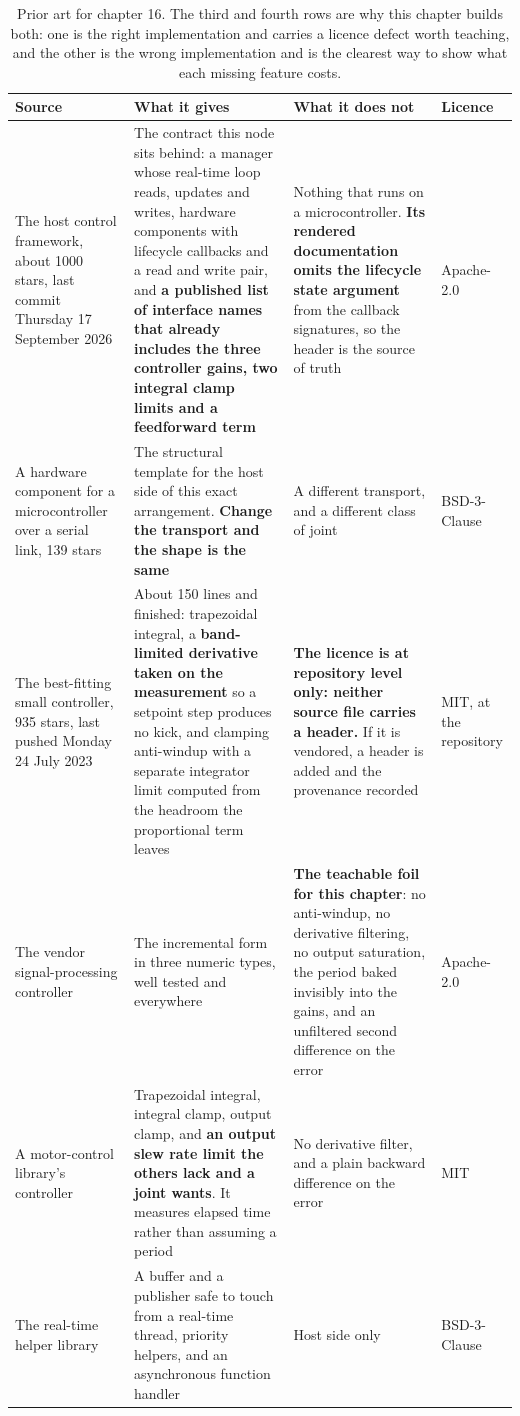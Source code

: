 \begin{table}[H]\centering\small
\begin{tabular}{p{34mm}p{46mm}p{38mm}p{20mm}}
\toprule
Source & What it gives & What it does not & Licence \\
\midrule
The host control framework, about 1000 stars, last commit Thursday 17 September
2026 & The contract this node sits behind: a manager whose real-time loop reads,
updates and writes, hardware components with lifecycle callbacks and a read and
write pair, and \textbf{a published list of interface names that already
includes the three controller gains, two integral clamp limits and a feedforward
term} & Nothing that runs on a microcontroller. \textbf{Its rendered
documentation omits the lifecycle state argument} from the callback signatures,
so the header is the source of truth & Apache-2.0 \\
A hardware component for a microcontroller over a serial link, 139 stars & The
structural template for the host side of this exact arrangement. \textbf{Change
the transport and the shape is the same} & A different transport, and a
different class of joint & BSD-3-Clause \\
The best-fitting small controller, 935 stars, last pushed Monday 24 July 2023 &
About 150 lines and finished: trapezoidal integral, a \textbf{band-limited
derivative taken on the measurement} so a setpoint step produces no kick, and
clamping anti-windup with a separate integrator limit computed from the headroom
the proportional term leaves & \textbf{The licence is at repository level only:
neither source file carries a header.} If it is vendored, a header is added and
the provenance recorded & MIT, at the repository \\
The vendor signal-processing controller & The incremental form in three numeric
types, well tested and everywhere & \textbf{The teachable foil for this
chapter}: no anti-windup, no derivative filtering, no output saturation, the
period baked invisibly into the gains, and an unfiltered second difference on
the error & Apache-2.0 \\
A motor-control library's controller & Trapezoidal integral, integral clamp,
output clamp, and \textbf{an output slew rate limit the others lack and a joint
wants}. It measures elapsed time rather than assuming a period & No derivative
filter, and a plain backward difference on the error & MIT \\
The real-time helper library & A buffer and a publisher safe to touch from a
real-time thread, priority helpers, and an asynchronous function handler & Host
side only & BSD-3-Clause \\
\bottomrule
\end{tabular}
\caption{Prior art for chapter 16. The third and fourth rows are why this chapter builds both: one is the right implementation and carries a licence defect worth teaching, and the other is the wrong implementation and is the clearest way to show what each missing feature costs.}
\end{table}

